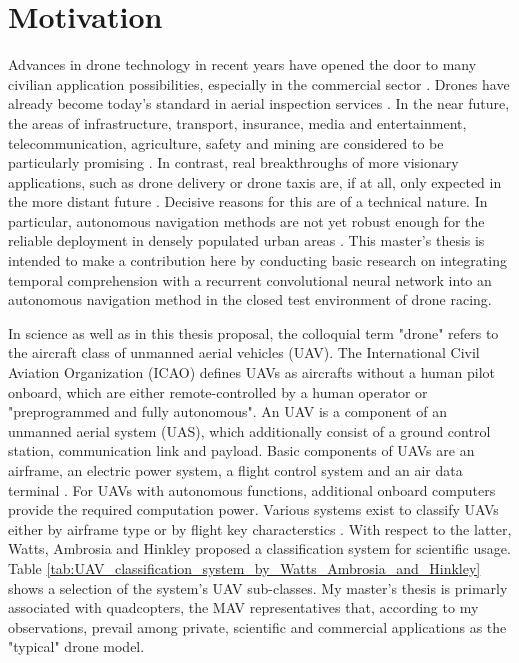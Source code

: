 \chapter{Motivation}

Advances in drone technology in recent years
have opened the door to many civilian application possibilities,
especially in the commercial sector \cite{MunichRE}.
Drones have already become today's standard in 
aerial inspection services 
\cite{McKinsey, Equinox, Percepto}.
In the near future, the areas of
infrastructure,
transport,
insurance,
media and entertainment,
telecommunication,
agriculture,
safety
and mining 
are considered to be particularly promising \cite{PwC2016}.
In contrast, 
real breakthroughs of more visionary applications, 
such as drone delivery or drone taxis
are, if at all, only expected in the more distant future \cite{Rosen2019}.
Decisive reasons for this are of a technical nature. 
In particular, autonomous navigation methods are not yet 
robust enough for the reliable deployment in densely populated urban areas \cite{loquercio2018learning}.
This master's thesis is intended to make a contribution here
by conducting basic research on integrating temporal comprehension with a recurrent convolutional neural network into
an autonomous navigation method in the closed test environment of drone racing.


In science as well as in this thesis proposal, the colloquial term "drone" refers
to the aircraft class of unmanned aerial vehicles (UAV).
The International Civil Aviation Organization (ICAO) \cite{ICAO2005} defines UAVs
as aircrafts without a human pilot onboard, 
which are either remote-controlled by a human operator or "preprogrammed and fully autonomous".
An UAV is a component of an unmanned aerial system (UAS), which additionally consist of a ground control station, communication link and payload. 
Basic components of UAVs are an airframe, an electric power system, a flight
control system and an air data terminal \cite{Fahlstrom2012}.
For UAVs with autonomous functions, additional onboard computers
provide the required computation power.
Various systems exist to classify UAVs either by 
airframe type \cite{Austin2011} or by flight key characterstics \cite{USDOD2011, Wei2016}.
With respect to the latter, 
Watts, Ambrosia and Hinkley \cite{Watts2012} proposed a classification system 
for scientific usage.
Table \ref{tab:UAV_classification_system_by_Watts_Ambrosia_and_Hinkley} shows a selection of the system's UAV sub-classes.
My master's thesis is primarly associated with quadcopters,
the MAV representatives that, according to my observations,
prevail among private, scientific and commercial applications as the "typical" drone model.


